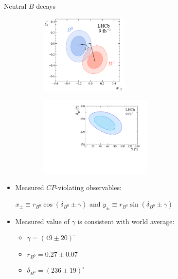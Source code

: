 \documentclass{beamer}
\begin{document}
\begin{frame}{Neutral $B$ decays}
  \begin{figure}
    \begin{subfigure}{0.45\textwidth}
      \includegraphics[height = 4.0cm]{Plots/cp_contours_B0toDKst.pdf}
    \end{subfigure}%
    \begin{subfigure}{0.45\textwidth}
      \includegraphics[height = 4.0cm]{Plots/B0ToDKStar_GGSZ_g_db_B0toDKst.pdf}
    \end{subfigure}
  \end{figure}
  \begin{itemize}
    \setlength\itemsep{0.5em}
    \item{Measured $C\!P$-violating observables:}
    \begin{center}
      $x_\pm\equiv r_{B^0}\cos(\delta_{B^0} \pm \gamma)$ and $y_\pm\equiv r_{B^0}\sin(\delta_{B^0} \pm \gamma)$
    \end{center}
    \item{Measured value of $\gamma$ is consistent with world average:}
    \begin{itemize}
      \item{$\gamma = (49 \pm 20)^\circ$}
      \item{$r_{B^0} = 0.27 \pm 0.07$}
      \item{$\delta_{B^0} = (236 \pm 19)^\circ$}
    \end{itemize}
  \end{itemize}
\end{frame}
\end{document}

